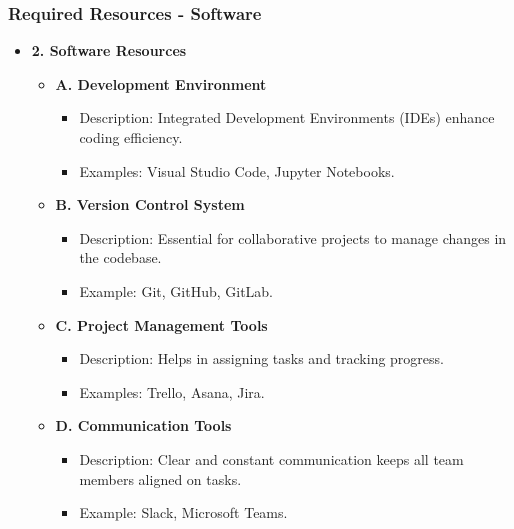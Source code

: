 \documentclass{beamer}
\begin{document}
\begin{frame}[fragile]
    \frametitle{Required Resources - Software}
    \begin{itemize}
        \item \textbf{2. Software Resources}
        \begin{itemize}
            \item \textbf{A. Development Environment}
            \begin{itemize}
                \item Description: Integrated Development Environments (IDEs) enhance coding efficiency.
                \item Examples: Visual Studio Code, Jupyter Notebooks.
            \end{itemize}

            \item \textbf{B. Version Control System}
            \begin{itemize}
                \item Description: Essential for collaborative projects to manage changes in the codebase.
                \item Example: Git, GitHub, GitLab.
            \end{itemize}
        
            \item \textbf{C. Project Management Tools}
            \begin{itemize}
                \item Description: Helps in assigning tasks and tracking progress.
                \item Examples: Trello, Asana, Jira.
            \end{itemize}
        
            \item \textbf{D. Communication Tools}
            \begin{itemize}
                \item Description: Clear and constant communication keeps all team members aligned on tasks.
                \item Example: Slack, Microsoft Teams.
            \end{itemize}
        \end{itemize}
    \end{itemize}
\end{frame}
\end{document}
